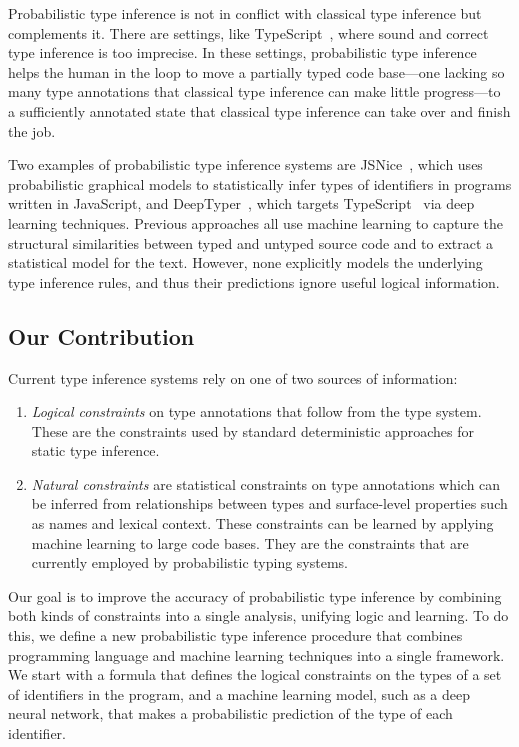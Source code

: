 \documentclass[sigplan,10pt,review,anonymous]{acmart} %
\theoremstyle{plain}
\theoremstyle{remark}
\theoremstyle{definition}
\begin{document}
Probabilistic type inference is not in conflict with classical type inference but complements it.
There are settings, like TypeScript~\cite{typescript}, where sound and correct type inference is too imprecise.
In these settings, probabilistic type inference helps the human in the loop to move a
partially typed code base---one lacking so many type annotations that classical type inference
can make little progress---to a sufficiently annotated state that classical type inference can take over and finish the job.

Two examples of probabilistic type inference systems are JSNice~\cite{raychev15},
which uses probabilistic graphical models to statistically infer types of identifiers
in programs written in JavaScript,
and DeepTyper~\cite{hellendoorn18}, which targets TypeScript~\cite{typescript} via deep learning techniques.
Previous approaches all use machine learning to capture the structural
similarities between typed and untyped source code and to extract a statistical model for
the text. However, none explicitly models the underlying
type inference rules, and thus their predictions ignore useful logical information.

\subsection{Our Contribution}
Current type inference systems rely
on one of two sources of information:
\begin{enumerate}[label=(\Roman*)]
	\item \emph{Logical constraints} on type annotations that follow from the type system.
	      These are the  constraints used by standard deterministic approaches for static type inference.
	\item \emph{Natural constraints} are statistical constraints on type annotations
	      which can be inferred from relationships between types and surface-level properties such as names and lexical context.
	      These constraints can be learned by applying machine learning to large code bases.
	      They are the constraints that are currently employed by probabilistic typing systems.
\end{enumerate}
Our goal is to improve the accuracy of probabilistic type
inference by combining both kinds of constraints into a single analysis, unifying logic and learning.
To do this, we define a new probabilistic type inference procedure that combines
programming language and machine learning techniques into a single framework.
We start with a formula that defines the logical constraints on the types of a set of identifiers in the program,
and a machine learning model, such as a deep neural network, that makes a probabilistic prediction
of the type of each identifier.
\end{document}
